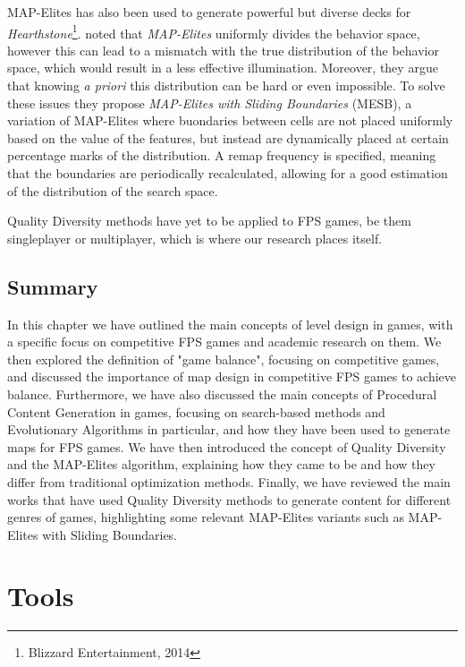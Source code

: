 \documentclass{Configuration_Files/PoliMi3i_thesis}
\begin{document}
MAP-Elites has also been used to generate powerful but diverse decks for \textit{Hearthstone}\footnote{Blizzard Entertainment, 2014}. \citeauthor{fontaine_mapping_2019} noted that \textit{MAP-Elites} uniformly divides the behavior space, however this can lead to a mismatch with the true distribution of the behavior space, which would result in a less effective illumination. Moreover, they argue that knowing \textit{a priori} this distribution can be hard or even impossible. To solve these issues they propose \textit{MAP-Elites with Sliding Boundaries} (MESB), a variation of MAP-Elites where buondaries between cells are not placed uniformly based on the value of the features, but instead are dynamically placed at certain percentage marks of the distribution. A remap frequency is specified, meaning that the boundaries are periodically recalculated, allowing for a good estimation of the distribution of the search space. \cite{fontaine_mapping_2019}

Quality Diversity methods have yet to be applied to FPS games, be them singleplayer or multiplayer, which is where our research places itself.

\section{Summary}
\label{sec:ch1_summary}
In this chapter we have outlined the main concepts of level design in games, with a specific focus on competitive FPS games and academic research on them. We then explored the definition of "game balance", focusing on competitive games, and discussed the importance of map design in competitive FPS games to achieve balance. Furthermore, we have also discussed the main concepts of Procedural Content Generation in games, focusing on search-based methods and Evolutionary Algorithms in particular, and how they have been used to generate maps for FPS games. We have then introduced the concept of Quality Diversity and the MAP-Elites algorithm, explaining how they came to be and how they differ from traditional optimization methods. Finally, we have reviewed the main works that have used Quality Diversity methods to generate content for different genres of games, highlighting some relevant MAP-Elites variants such as MAP-Elites with Sliding Boundaries.


\chapter{Tools}
\label{ch:tools}
\end{document}
